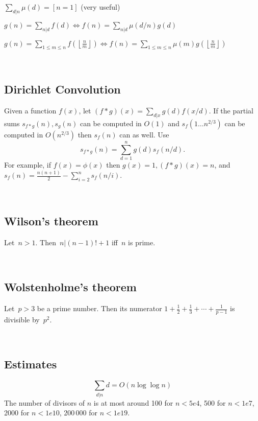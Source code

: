   $ \sum_{d | n} \mu(d) = [ n = 1] $ (very useful)

  $ g(n) = \sum_{n|d} f(d) \Leftrightarrow f(n) = \sum_{n|d} \mu(d/n)g(d)$

 $ g(n) = \sum_{1 \leq m \leq n} f(\left\lfloor\frac{n}{m}\right \rfloor ) \Leftrightarrow f(n) = \sum_{1\leq m\leq n} \mu(m)g(\left\lfloor\frac{n}{m}\right\rfloor)$

\


\subsection{Dirichlet Convolution}

Given a function $f(x)$, let $(f*g)(x)=\sum_{d|x}g(d)f(x/d)$. If the partial sums $s_{f*g}(n),s_g(n)$ can be computed in $O(1)$ and $s_f(1\ldots n^{2/3})$ can be computed in $O\left(n^{2/3}\right)$ then $s_f(n)$ can as well. Use
	$$s_{f*g}(n)=\sum_{d=1}^ng(d)s_f(n/d).$$ %
	For example, if $f(x)=\phi(x)$ then $g(x)=1, (f*g)(x)=n$, and $s_f(n)=\frac{n(n+1)}{2}-\sum_{i=2}^ns_f(n/i).$




\


\subsection{Wilson's theorem}
Let~$n > 1$. Then~$n|(n-1)!+1$ iff~$n$ is prime.


\


\subsection{Wolstenholme's theorem}
Let~$p > 3$ be a prime number. Then its numerator $ 1 + \frac{1}{2}+\frac{1}{3}+\cdots+\frac{1}{p-1} $
is divisible by~$p^2$.


\


\subsection{Estimates}
\[
	\sum_{d|n} d = O(n \log \log n)
\]
	The number of divisors of $n$ is at most around 100 for $n < 5e4$, 500 for $n < 1e7$, 2000 for $n < 1e10$, 200\,000 for $n < 1e19$.

